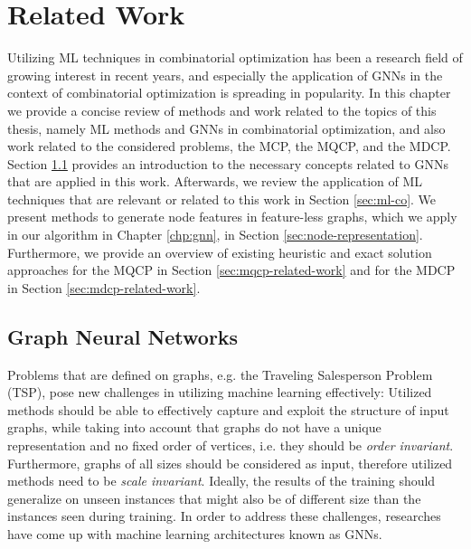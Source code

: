 \documentclass[draft,final]{vutinfth} %
\newtheorem{definition}{Definition}[section]
\begin{document}




\chapter{Related Work}\label{chp:related-work}

Utilizing ML techniques in combinatorial optimization has been a research field of growing interest in recent years, and especially the application of GNNs in the context of combinatorial optimization is spreading in popularity. 
In this chapter we provide a concise review of methods and work related to the topics of this thesis, namely ML methods and GNNs in combinatorial optimization, and also work related to the considered problems, the MCP, the MQCP, and the MDCP. Section \ref{sec:gnns} provides an introduction to the necessary concepts related to GNNs that are applied in this work. Afterwards, we review the application of ML techniques that are relevant or related to this work in Section \ref{sec:ml-co}. We present methods to generate node features in feature-less graphs, which we apply in our algorithm in Chapter \ref{chp:gnn}, in Section \ref{sec:node-representation}. Furthermore, we provide an overview of existing heuristic and exact solution approaches for the MQCP in Section \ref{sec:mqcp-related-work} and for the MDCP in Section \ref{sec:mdcp-related-work}. 

\section{Graph Neural Networks}\label{sec:gnns}
Problems that are defined on graphs, e.g. the Traveling Salesperson Problem (TSP), pose new challenges in utilizing machine learning effectively: Utilized methods should be able to effectively capture and exploit the structure of input graphs, while taking into account that graphs do not have a unique representation and no fixed order of vertices, i.e. they should be \emph{order invariant}. Furthermore, graphs of all sizes should be considered as input, therefore utilized methods need to be \emph{scale invariant}. Ideally, the results of the training should generalize on unseen instances that might also be of different size than the instances seen during training. In order to address these challenges, researches have come up with machine learning architectures known as GNNs. 
\end{document}
